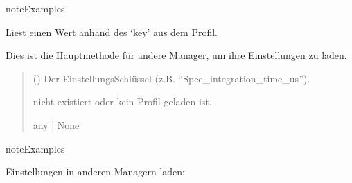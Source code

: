 \documentclass[letterpaper,10pt,english]{sphinxmanual}
\begin{document}
\begin{fulllineitems}
\begin{fulllineitems}
\begin{sphinxadmonition}{note}{Examples}
\begin{sphinxVerbatim}[commandchars=\\\{\}]
  
 
\end{sphinxVerbatim}
\end{sphinxadmonition}

\end{fulllineitems}


\begin{fulllineitems}
\label{\detokenize{modulab/profile_manager:modules.profile.ProfileManager.ProfileManager.read}}
\pysigstartsignatures
\pysiglinewithargsret
{}
{}
{}
\pysigstopsignatures
\sphinxAtStartPar
Liest einen Wert anhand des ‘key’ aus dem  Profil.

\sphinxAtStartPar
Dies ist die Hauptmethode für andere Manager, um ihre
Einstellungen zu laden.
\begin{quote}\begin{description}
\sphinxAtStartPar
{} () \textendash{} Der Einstellungs\sphinxhyphen{}Schlüssel (z.B. “Spec\_integration\_time\_us”).

\sphinxAtStartPar
\begin{description}
\sphinxAtStartPar
nicht existiert oder kein Profil geladen ist.

\end{description}


\sphinxAtStartPar
any | None

\end{description}\end{quote}

\begin{sphinxadmonition}{note}{Examples}

\sphinxAtStartPar
Einstellungen in anderen Managern laden:


\end{sphinxadmonition}
\end{fulllineitems}
\end{fulllineitems}
\end{document}
